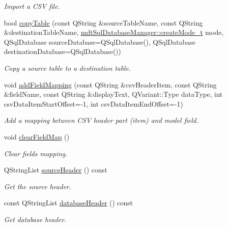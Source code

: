 \begin{DoxyCompactItemize}
\begin{DoxyCompactList}\small\item\em Import a C\-S\-V file. \end{DoxyCompactList}\item 
bool \hyperlink{classmdt_data_table_manager_a5c8aaf4f42a50bd0c216ef29adc9d79f}{copy\-Table} (const Q\-String \&source\-Table\-Name, const Q\-String \&destination\-Table\-Name, \hyperlink{classmdt_sql_database_manager_a2f5b46d67a88095053a5edfc415c7418}{mdt\-Sql\-Database\-Manager\-::create\-Mode\-\_\-t} mode, Q\-Sql\-Database source\-Database=Q\-Sql\-Database(), Q\-Sql\-Database destination\-Database=Q\-Sql\-Database())
\begin{DoxyCompactList}\small\item\em Copy a source table to a destination table. \end{DoxyCompactList}\item 
void \hyperlink{classmdt_data_table_manager_a2b38e6a8157183fcbce0770d12e9aa9d}{add\-Field\-Mapping} (const Q\-String \&csv\-Header\-Item, const Q\-String \&field\-Name, const Q\-String \&display\-Text, Q\-Variant\-::\-Type data\-Type, int csv\-Data\-Item\-Start\-Offset=-\/1, int csv\-Data\-Item\-End\-Offset=-\/1)
\begin{DoxyCompactList}\small\item\em Add a mapping between C\-S\-V header part (item) and model field. \end{DoxyCompactList}\item 
void \hyperlink{classmdt_data_table_manager_a10c9f9d57d6c35fa5721906c79376ec4}{clear\-Field\-Map} ()
\begin{DoxyCompactList}\small\item\em Clear fields mapping. \end{DoxyCompactList}\item 
Q\-String\-List \hyperlink{classmdt_data_table_manager_a5cafc38a5570c51757dbac7e8c2fd978}{source\-Header} () const 
\begin{DoxyCompactList}\small\item\em Get the source header. \end{DoxyCompactList}\item 
const Q\-String\-List \hyperlink{classmdt_data_table_manager_a0edc657a7dbcfcf251e6ce27560d40e5}{database\-Header} () const 
\begin{DoxyCompactList}\small\item\em Get database header. \end{DoxyCompactList}\item 

\end{DoxyCompactItemize}
